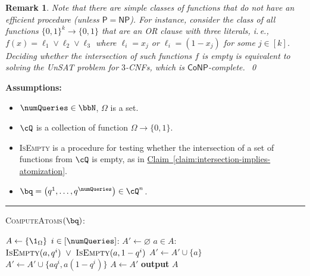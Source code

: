 \documentclass[11pt]{article}
\newcommand{\expref}[2]{\texorpdfstring{\hyperref[#2]{#1~\ref{#2}}}{#1~\ref{#2}}}
\newtheorem{remark}[theorem]{Remark}
\newcommand{\ie}{i.\,e.}
\begin{document}
\begin{remark}
	Note that there are simple classes of functions that do not have an efficient procedure {} (unless $\mathsf{P} = \mathsf{NP}$). For instance, consider the class of all functions $\{0,1\}^k \to \{0,1\}$ that are an OR clause with three literals, \ie, $f(x) = \ell_1 \vee \ell_2 \vee \ell_3$ where $\ell_i = x_j$ or $\ell_i = (1-x_j)$ for some $j \in [k]$. Deciding whether the intersection of such functions $f$ is empty is equivalent to solving the UnSAT problem for $3$-CNFs, which is $\mathsf{CoNP}$-complete.~\qed
\end{remark}

\begin{algorithmFloat}[H]
	\begin{ShadedAlgorithmBox}
		{\bfseries Assumptions:} 
		\begin{itemize}
			\item{
				$\numQueries \in \bbN$, $\Omega$ is a set.
			}
			\item{
				$\cQ$ is a collection of function $\Omega \to \{0,1\}$.
			}
			\item{
				\textsc{IsEmpty} is a procedure for testing whether the intersection of a set of functions from $\cQ$ is empty, as in \expref{Claim}{claim:intersection-implies-atomization}.
			}
			\item{
				$\bq = \left(q^1,\dots,q^{\numQueries}\right) \in \cQ^n$.
			}
		\end{itemize}
		
		\noindent\rule{\textwidth}{0.5pt}
		
		\vspace*{0.5em}
		
		\textsc{ComputeAtoms}$(\bq)$:
		\begin{algorithmic}
			\vsp
			\State $A \gets \{\1_\Omega\}$
			\vsp
			\For $i \in [\numQueries]$:
				\State $A' \gets \varnothing$
				\For $a \in A$:
					\If $%
							\textsc{IsEmpty}(a,q^i)
						~ \lor ~ 
							\textsc{IsEmpty}(a,1-q^i)
						$
						\State $A' \gets A' \cup \{a\}$
					\Else
						\State $A' \gets A' \cup \{aq^i,a(1-q^i)\}$
					\EndIf
				\EndFor
				\State $A \gets A'$
			\EndFor
			\vsp
			\State \textbf{output} $A$
		\end{algorithmic}
	\end{ShadedAlgorithmBox}
	
	\caption{An algorithm for computing the atoms of a set of statistical queries.}

	\label{algorithm:compute-atoms}
\end{algorithmFloat}
\end{document}
